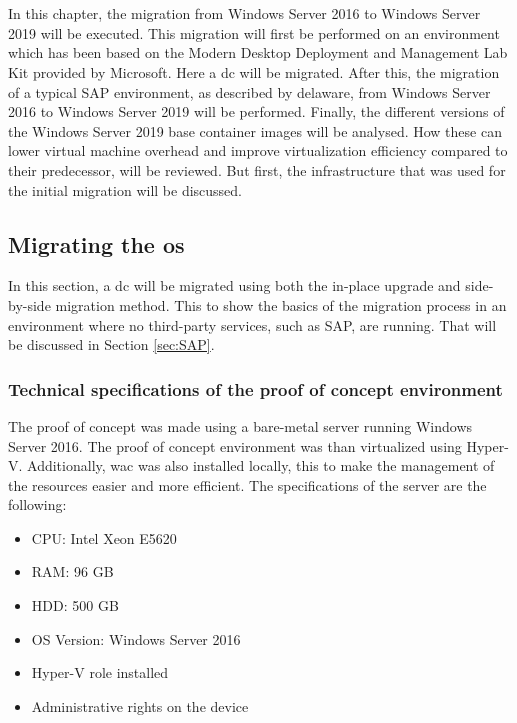\chapter{}
\label{ch:methodologie}
In this chapter, the migration from Windows Server 2016 to Windows Server 2019 will be executed. 
This migration will first be performed on an environment which has been based on the Modern Desktop Deployment and Management Lab Kit provided by Microsoft. \autocite{Gallagher2018} 
Here a \acrfull{dc} will be migrated. 
After this, the migration of a typical SAP environment, as described by delaware, from Windows Server 2016 to Windows Server 2019 will be performed. 
Finally, the different versions of the Windows Server 2019 base container images will be analysed. 
How these can lower virtual machine overhead and improve virtualization efficiency compared to their predecessor, will be reviewed. 
But first, the infrastructure that was used for the initial migration will be discussed.

\section{Migrating the \acrshort{os}}
\label{sec:Migrating_the_OS}
In this section, a \acrshort{dc} will be migrated using both the in-place upgrade and side-by-side migration method. 
This to show the basics of the migration process in an environment where no third-party services, such as SAP, are running. 
That will be discussed in Section \ref{sec:SAP}.

\subsection{Technical specifications of the proof of concept environment}
The proof of concept was made using a bare-metal server running Windows Server 2016. 
The proof of concept environment was than virtualized using Hyper-V. 
Additionally, \acrlong{wac} was also installed locally, this to make the management of the resources easier and more efficient.
The specifications of the server are the following:

\begin{itemize}
	\item CPU: Intel Xeon E5620
	\item RAM: 96 GB 
	\item HDD: 500 GB
	\item OS Version: Windows Server 2016
	\item Hyper-V role installed
	\item Administrative rights on the device
\end{itemize}

